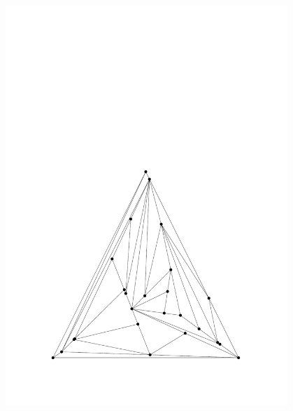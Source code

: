 \begin{figure}
\begin{minipage}{0.48\textwidth}
    \includegraphics[width=0.95\textwidth]{vis_25_1.pdf}
  \end{minipage}
  \hfill
  \begin{minipage}{0.48\textwidth}
 \centering

\end{minipage}
\end{figure}
